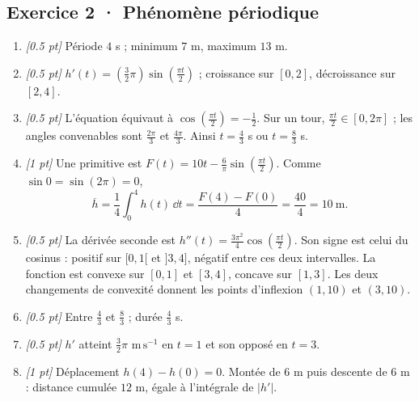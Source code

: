 \subsection*{Exercice 2 · Phénomène périodique}\begin{enumerate}

\item \textit{[\num{0,5} pt]} Période $4$ s ; minimum $7$ m, maximum $13$ m.

\item \textit{[\num{0,5} pt]} $h'(t)=(\frac{3}{2}\pi)\sin (\frac{\pi t}{2})$ ; croissance sur $[0,2]$, décroissance sur $[2,4]$.

\item \textit{[\num{0,5} pt]} L'équation équivaut à $\cos (\frac{\pi t}{2})=-\frac{1}{2}$. Sur un tour, $\frac{\pi t}{2}\in[0,2\pi]$ ; les angles convenables sont $\frac{2\pi}{3}$ et $\frac{4\pi}{3}$. Ainsi $t=\frac{4}{3}$ s ou $t=\frac{8}{3}$ s.

\item \textit{[1 pt]} Une primitive est $F(t)=10t-\frac{6}{\pi}\sin (\frac{\pi t}{2})$. Comme $\sin0=\sin(2\pi)=0$,
\[\overline h=\frac{1}{4}\int_0^{4}h(t)\,\dd t=\frac{F(4)-F(0)}{4}=\frac{40}{4}=10\ \mathrm{m}.\]

\item \textit{[\num{0,5} pt]} La dérivée seconde est $h''(t)=\frac{3\pi^2}{4}\cos (\frac{\pi t}{2})$. Son signe est celui du cosinus : positif sur $[0,1[$ et $]3,4]$, négatif entre ces deux intervalles. La fonction est convexe sur $[0,1]$ et $[3,4]$, concave sur $[1,3]$. Les deux changements de convexité donnent les points d'inflexion $(1,10)$ et $(3,10)$.

\item \textit{[\num{0,5} pt]} Entre $\frac{4}{3}$ et $\frac{8}{3}$ ; durée $\frac{4}{3}$ s.

\item \textit{[\num{0,5} pt]} $h'$ atteint $\frac{3}{2}\pi$ $\mathrm{m\,s^{-1}}$ en $t=1$ et son opposé en $t=3$.

\item \textit{[1 pt]} Déplacement $h(4)-h(0)=0$. Montée de $6$ m puis descente de $6$ m : distance cumulée $12$ m, égale à l'intégrale de $|h'|$.

\end{enumerate}

